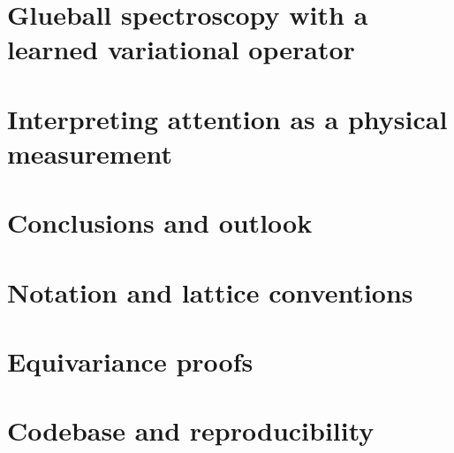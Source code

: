 \documentclass[noexaminfo]{sapthesis}
\begin{document}
\chapter{Glueball spectroscopy with a learned variational operator}
\label{ch:glueball}


\chapter{Interpreting attention as a physical measurement}
\label{ch:interpretability}


\chapter{Conclusions and outlook}
\label{ch:conclusions}


\appendix
\chapter{Notation and lattice conventions}
\label{app:appendix_a}


\chapter{Equivariance proofs}
\label{app:appendix_b}


\chapter{Codebase and reproducibility}
\label{app:appendix_c}


\backmatter
\cleardoublepage
{}
{}
\printbibliography
\end{document}
